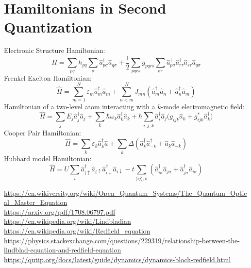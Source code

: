 \documentclass[9pt]{report}
\begin{document}
\section{Hamiltonians in Second Quantization}
Electronic Structure Hamiltonian:
\begin{equation}
\hat{H} = \sum_{pq}h_{pq}\sum_{\sigma}\hat{a}^{\dagger}_{p\sigma}\hat{a}_{q\sigma}+\frac{1}{2}\sum_{pqrs}g_{pqrs}\sum_{\sigma\tau}\hat{a}_{p\sigma}^{\dagger}\hat{a}_{r\tau}^{\dagger}\hat{a}_{s\tau}\hat{a}_{q\sigma}
\end{equation}
Frenkel Exciton Hamiltonian:
\begin{equation}
\hat{H}=\sum_{m=1}^{N}\varepsilon_{m}\hat{a}^{\dagger}_{m}\hat{a}_{m}+\sum_{n<m}^{N}J_{mn}(\hat{a}^{\dagger}_{m}\hat{a}_{n}+\hat{a}_{n}^{\dagger}\hat{a}_{m})
\end{equation}
Hamiltonian of a two-level atom interacting with a $k$-mode electromagnetic field:
\begin{equation}
\hat{H}=\sum_{j}E_{j}\hat{a}_{j}^{\dagger}\hat{a}_{j} +\sum_{k}\hbar\omega_{k}\hat{a}_{k}^{\dagger}\hat{a}_{k} +\hbar\sum_{i,j,k}\hat{a}_{i}^{\dagger}\hat{a}_{j}\big(g_{ijk}\hat{a}_{k}+g_{ijk}^{*}\hat{a}_{k}^{\dagger}\big)
\end{equation}
Cooper Pair Hamiltonian:
\begin{equation}
\hat{H}=\sum_{k}\varepsilon_{k}\hat{a}_{k}^{\dagger}\hat{a} +\sum_{k}\Delta(\hat{a}^{\dagger}_{k}\hat{a}^{\dagger}_{-k}+\hat{a}_{k}\hat{a}_{-k})
\end{equation}
Hubbard model Hamiltonian:
\begin{equation}
\hat{H}= U\sum_{i}\hat{a}_{i\uparrow}^{\dagger}\hat{a}_{i\uparrow}\hat{a}^{\dagger}_{i\downarrow}\hat{a}_{i\downarrow}-t\sum_{\langle ij\rangle,\sigma}(\hat{a}_{i\sigma}^{\dagger}\hat{a}_{j\sigma}+\hat{a}_{j\sigma}^{\dagger}\hat{a}_{i\sigma})
\end{equation}



\url{https://en.wikiversity.org/wiki/Open_Quantum_Systems/The_Quantum_Optical_Master_Equation}\\
\url{https://arxiv.org/pdf/1708.06797.pdf}\\
\url{https://en.wikipedia.org/wiki/Lindbladian}\\
\url{https://en.wikipedia.org/wiki/Redfield_equation}\\
\url{https://physics.stackexchange.com/questions/229319/relationship-between-the-lindblad-equation-and-redfield-equation}\\
\url{https://qutip.org/docs/latest/guide/dynamics/dynamics-bloch-redfield.html}
\end{document}
